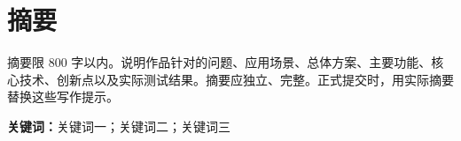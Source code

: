 ﻿\chapter*{摘要}
摘要限 800 字以内。说明作品针对的问题、应用场景、总体方案、主要功能、核心技术、创新点以及实际测试结果。摘要应独立、完整。正式提交时，用实际摘要替换这些写作提示。

\noindent\textbf{关键词：}关键词一；关键词二；关键词三
